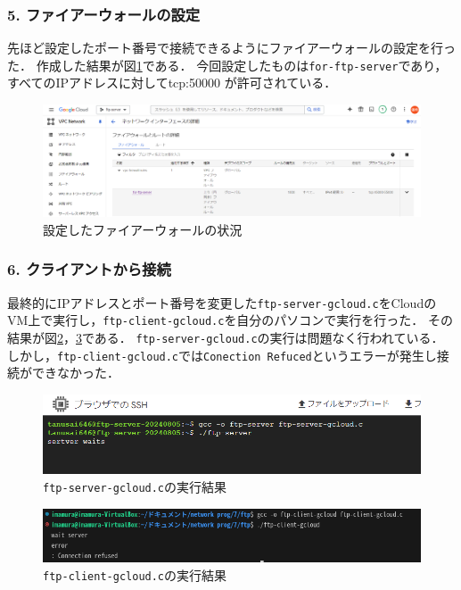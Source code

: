 \documentclass[documentclass]{jsarticle}
\begin{document}
\subsubsection*{5. ファイアーウォールの設定}
先ほど設定したポート番号で接続できるようにファイアーウォールの設定を行った．
作成した結果が図\ref*{fig:4-4}である．
今回設定したものは\texttt{for-ftp-server}であり，すべてのIPアドレスに対してtcp:50000 が許可されている．

\begin{figure}[H]
  \begin{center}
    \includegraphics*[scale=0.35]{figure/4-4.png}
  \end{center}
  \caption{設定したファイアーウォールの状況}
  \label{fig:4-4}
\end{figure}

\subsubsection*{6. クライアントから接続}
最終的にIPアドレスとポート番号を変更した\texttt{ftp-server-gcloud.c}をCloudのVM上で実行し，\texttt{ftp-client-gcloud.c}を自分のパソコンで実行を行った．
その結果が図\ref*{fig:4-5}，\ref*{fig:4-6}である．
\texttt{ftp-server-gcloud.c}の実行は問題なく行われている．
しかし，\texttt{ftp-client-gcloud.c}では\texttt{Conection Refuced}というエラーが発生し接続ができなかった．

\begin{figure}[H]
  \begin{center}
    \includegraphics*[scale=0.8]{figure/4-5.png}
  \end{center}
  \caption{\texttt{ftp-server-gcloud.c}の実行結果}
  \label{fig:4-5}
\end{figure}

\begin{figure}[H]
  \begin{center}
    \includegraphics*[scale=0.8]{figure/4-6.png}
  \end{center}
  \caption{\texttt{ftp-client-gcloud.c}の実行結果}
  \label{fig:4-6}
\end{figure}
\end{document}
